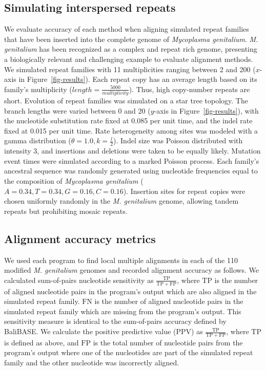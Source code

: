 \documentclass{ws-procs975x65}
\begin{document}
\subsection{Simulating interspersed repeats}
We evaluate accuracy of each method when aligning simulated repeat families that have been inserted into the complete genome of \emph{Mycoplasma genitalium}. \emph{M. genitalium} has been recognized as a complex and repeat rich genome, presenting a biologically relevant and challenging example to evaluate alignment methods\cite{ref-mycoplasma}. We simulated repeat families with 11 multiplicities ranging between 2 and 200 ($x$-axis in Figure~\ref{fig-results}).  Each repeat copy has an average length based on its family's multiplicity ($length=\frac{5000}{multiplicity}$).  Thus, high copy-number repeats are short.  Evolution of repeat families was simulated on a star tree topology.  The branch lengths were varied between 0 and 20 ($y$-axis in Figure~\ref{fig-results}), with the nucleotide substitution rate fixed at 0.085 per unit time, and the indel rate fixed at 0.015 per unit time.  Rate heterogeneity among sites was modeled with a gamma distribution ($\theta = 1.0, k = \frac{l}{2}$).  Indel size was Poisson distributed with intensity 3, and insertions and deletions were taken to be equally likely.  Mutation event times were simulated according to a marked Poisson process.  Each family's ancestral sequence was randomly generated using nucleotide frequencies equal to the composition of \emph{Mycoplasma genitalium} ($A=0.34,T=0.34,G=0.16,C=0.16$). Insertion sites for repeat copies were chosen uniformly randomly in the \textit{M. genitalium} genome, allowing tandem repeats but prohibiting mosaic repeats.

\subsection{Alignment accuracy metrics}
We used each program to find local multiple alignments in each of the 110 modified \emph{M. genitalium} genomes and recorded alignment accuracy as follows. We calculated sum-of-pairs nucleotide sensitivity as $\frac{\mathrm{TP}}{\mathrm{TP} + \mathrm{FP}}$, where $\mathrm{TP}$ is the number of aligned nucleotide pairs in the program's output which are also aligned in the simulated repeat family.  $\mathrm{FN}$ is the number of aligned nucleotide pairs in the simulated repeat family which are missing from the program's output.  This sensitivity measure is identical to the sum-of-pairs accuracy defined by BaliBASE\cite{ref-balibase}.  We calculate the positive predictive value (PPV) as $\frac{\mathrm{TP}}{\mathrm{TP} + \mathrm{FP}}$, where $\mathrm{TP}$ is defined as above, and $\mathrm{FP}$ is the total number of nucleotide pairs from the program's output where one of the nucleotides are part of the simulated repeat family and the other nucleotide was incorrectly aligned.
\end{document}
